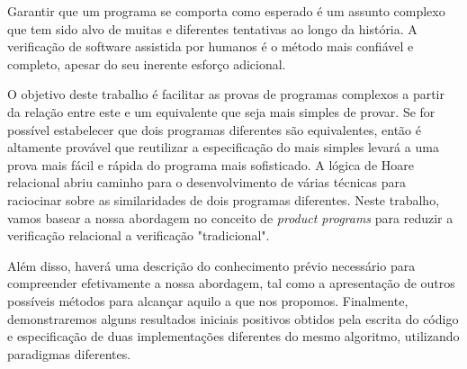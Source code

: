 
%

Garantir que um programa se comporta como esperado é um assunto complexo que tem sido alvo de muitas e diferentes tentativas ao longo da história.
A verificação de software assistida por humanos é o método mais confiável e completo, apesar do seu inerente esforço adicional.

O objetivo deste trabalho é facilitar as provas de programas complexos a partir da relação entre este e um equivalente que seja mais simples de provar.
Se for possível estabelecer que dois programas diferentes são equivalentes, então é altamente provável que reutilizar a especificação do mais simples levará a uma prova mais fácil e rápida do programa mais sofisticado.
A lógica de Hoare relacional abriu caminho para o desenvolvimento de várias técnicas para raciocinar sobre as similaridades de dois programas diferentes.
Neste trabalho, vamos basear a nossa abordagem no conceito de \emph{product programs} para reduzir a verificação relacional a verificação "tradicional".

Além disso, haverá uma descrição do conhecimento prévio necessário para compreender efetivamente a nossa abordagem, tal como a apresentação de outros possíveis métodos para alcançar aquilo a que nos propomos.
Finalmente, demonstraremos alguns resultados iniciais positivos obtidos pela escrita do código e especificação de duas implementações diferentes do mesmo algoritmo, utilizando paradigmas diferentes.

